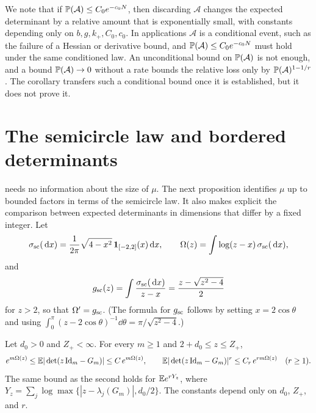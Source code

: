 We note that if $\mathbb P(\mathcal A)\le C_0e^{-c_0N}$, then discarding $\mathcal A$ changes the expected determinant by a relative amount that is exponentially small, with constants depending only on $b,g,k_+,C_0,c_0$. In applications $\mathcal A$ is a conditional event, such as the failure of a Hessian or derivative bound, and $\mathbb P(\mathcal A)\le C_0e^{-c_0N}$ must hold under the same conditioned law. An unconditional bound on $\mathbb P(\mathcal A)$ is not enough, and a bound $\mathbb P(\mathcal A)\to0$ without a rate bounds the relative loss only by $\mathbb P(\mathcal A)^{1-1/r}$. The corollary transfers such a conditional bound once it is established, but it does not prove it.

\section{The semicircle law and bordered determinants}\label{sec:kr-border}

 needs no information about the size of $\mu$. The next proposition identifies $\mu$ up to bounded factors in terms of the semicircle law. It also makes explicit the comparison between expected determinants in dimensions that differ by a fixed integer. Let
\[
\sigma_{\rm sc}(\,\mathrm d x)=\frac1{2\pi}\sqrt{4-x^2}\,\mathbf 1_{[-2,2]}(x)\,\mathrm d x,\qquad \Omega(z)=\int\log(z-x)\,\sigma_{\rm sc}(\,\mathrm d x),
\]
and
\[
g_{\rm sc}(z)=\int\frac{\sigma_{\rm sc}(\,\mathrm d x)}{z-x}=\frac{z-\sqrt{z^2-4}}2
\]
for $z>2$, so that $\Omega'=g_{\rm sc}$. (The formula for $g_{\rm sc}$ follows by setting $x=2\cos\theta$ and using $\int_0^\pi(z-2\cos\theta)^{-1}\dd\theta=\pi/\sqrt{z^2-4}$.)

\begin{proposition}\label{prop:kr-prefactors}
Let $d_0>0$ and $Z_+<\infty$. For every $m\ge1$ and $2+d_0\le z\le Z_+$,
\begin{equation}\label{eq:kr-prefactors}
e^{m\Omega(z)}\le\mathbb E|\det(z\,\mathrm{Id}_m-G_m)|\le C\,e^{m\Omega(z)},\qquad \mathbb E|\det(z\,\mathrm{Id}_m-G_m)|^r\le C_r\,e^{rm\Omega(z)}\quad(r\ge1).
\end{equation}
The same bound as the second holds for $\mathbb E e^{rY_z}$, where $Y_z=\sum_j\log\max\{|z-\lambda_j(G_m)|,d_0/2\}$. The constants depend only on $d_0$, $Z_+$, and $r$.
\end{proposition}

